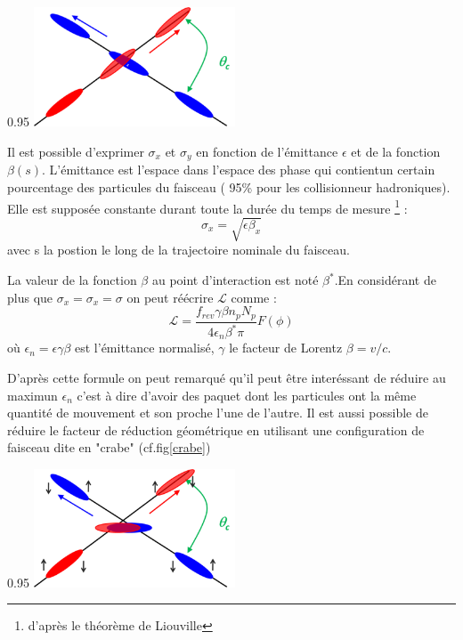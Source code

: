 \begin{minipagewithmarginpars}[h]{0.95\textwidth}
\centering
\includegraphics[width=0.45\textwidth]{LHC/collision.png}
\label{collision}	
\end{minipagewithmarginpars}

Il est possible d'exprimer $\sigma_{x}$ et $\sigma_{y}$ en fonction de l'émittance $\epsilon$ et de la fonction $\beta(s)$. L'émittance est l'espace dans l'espace des phase qui contientun certain pourcentage des particules du faisceau ( 95\% pour les collisionneur hadroniques). Elle est supposée constante durant toute la durée du temps de mesure \footnote{d'après le théorème de Liouville} :
\begin{equation}
\sigma_{x}=\sqrt{\epsilon\beta_{x}}
\end{equation}
avec s la postion le long de la trajectoire nominale du faisceau.

La valeur de la fonction $\beta$ au point d'interaction est noté $\beta^{*}$.En considérant de plus que $\sigma_{x}=\sigma_{x}=\sigma$ on peut réécrire $\mathcal{L}$ comme :
\begin{equation}
\mathcal{L}=\frac{f_{rev}\gamma\beta n_{p}N_{p}}{4\epsilon_{n}\beta^{*}\pi} F(\phi)
\end{equation}
où $\epsilon_{n}=\epsilon\gamma\beta$ est l'émittance normalisé, $\gamma$ le facteur de Lorentz $\beta=v/c$.

D'après cette formule on peut remarqué qu'il peut être interéssant de réduire au maximun $\epsilon_{n}$ c'est à dire d'avoir des paquet dont les particules ont la même quantité de mouvement et son proche l'une de l'autre. Il est aussi possible de réduire le facteur de réduction géométrique en utilisant une configuration de faisceau dite en "crabe" (cf.fig\ref{crabe})

\begin{minipagewithmarginpars}[h]{0.95\textwidth}
\centering
\includegraphics[width=0.45\textwidth]{LHC/crab.png}
\label{crabe}	
\end{minipagewithmarginpars}

